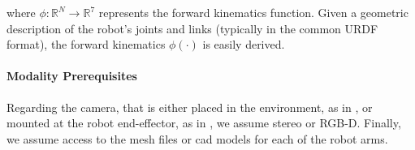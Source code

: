 where $\phi: \mathbb{R}^N\rightarrow\mathbb{R}^{7}$ represents the forward kinematics function. Given a geometric description of the robot's joints and links (typically in the common URDF format), the forward kinematics $\phi(\cdot)$ is easily derived.

\paragraph{Modality Prerequisites} Regarding the camera, that is either placed in the environment, as in , or mounted at the robot end-effector, as in , we assume stereo or RGB-D. Finally, we assume access to the mesh files or \gls{cad} models for each of the robot arms.






